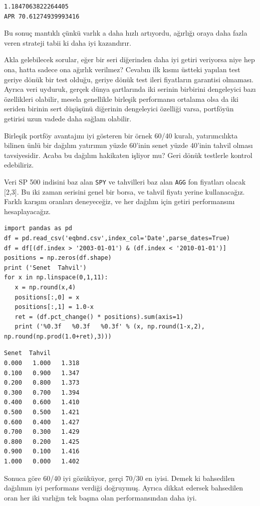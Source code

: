 \documentclass[12pt,fleqn]{article}\usepackage{../../common}
\begin{document}
\begin{verbatim}
1.1847063822264405
APR 70.61274939993416
\end{verbatim}

Bu sonuç mantıklı çünkü varlık a daha hızlı artıyordu, ağırlığı oraya daha fazla
veren strateji tabii ki daha iyi kazandırır.

Akla gelebilecek sorular, eğer bir seri diğerinden daha iyi getiri veriyorsa
niye hep ona, hatta sadece ona ağırlık verilmez? Cevabın ilk kısmı üstteki
yapılan test geriye dönük bir test olduğu, geriye dönük test ileri fiyatların
garantisi olmaması. Ayrıca veri uyduruk, gerçek dünya şartlarında iki serinin
birbirini dengeleyici bazı özellikleri olabilir, mesela genellikle birleşik
performansı ortalama olsa da iki seriden birinin sert düşüşünü diğerinin
dengeleyici özelliği varsa, portföyün getirisi uzun vadede daha sağlam
olabilir.

Birleşik portföy avantajını iyi gösteren bir örnek 60/40 kuralı, yatırımcılıkta
bilinen ünlü bir dağılım yatırımın yüzde 60'inin senet yüzde 40'inin tahvil
olması tavsiyesidir. Acaba bu dağılım hakikaten işliyor mu? Geri dönük testlerle
kontrol edebiliriz. 

Veri SP 500 indisini baz alan \verb!SPY! ve tahvilleri baz alan \verb!AGG! fon
fiyatları olacak [2,3]. Bu iki zaman serisini genel bir borsa, ve tahvil fiyatı
yerine kullanacağız. Farklı karışım oranları deneyeceğiz, ve her dağılım için
getiri performansını hesaplayacağız.

\begin{verbatim}
import pandas as pd
df = pd.read_csv('eqbnd.csv',index_col='Date',parse_dates=True)
df = df[(df.index > '2003-01-01') & (df.index < '2010-01-01')]
positions = np.zeros(df.shape)
print ('Senet  Tahvil')
for x in np.linspace(0,1,11):
   x = np.round(x,4)
   positions[:,0] = x
   positions[:,1] = 1.0-x
   ret = (df.pct_change() * positions).sum(axis=1)
   print ('%0.3f   %0.3f   %0.3f' % (x, np.round(1-x,2), np.round(np.prod(1.0+ret),3)))
\end{verbatim}

\begin{verbatim}
Senet  Tahvil
0.000   1.000   1.318
0.100   0.900   1.347
0.200   0.800   1.373
0.300   0.700   1.394
0.400   0.600   1.410
0.500   0.500   1.421
0.600   0.400   1.427
0.700   0.300   1.429
0.800   0.200   1.425
0.900   0.100   1.416
1.000   0.000   1.402
\end{verbatim}

Sonuca göre 60/40 iyi gözüküyor, gerçi 70/30 en iyisi. Demek ki bahsedilen
dağılımın iyi performans verdiği doğruymuş. Ayrıca dikkat edersek bahsedilen
oran her iki varlığın tek başına olan performansından daha iyi.
\end{document}
